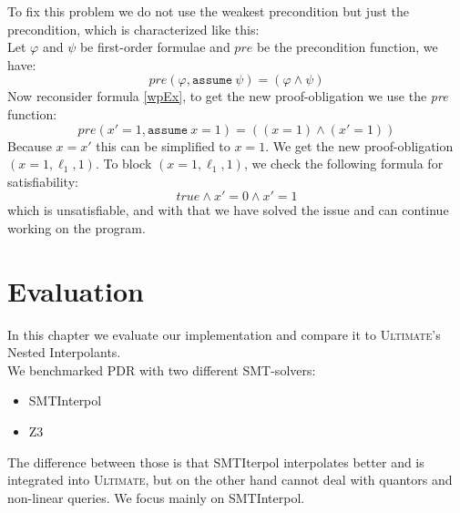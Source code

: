 \documentclass[11pt, a4paper, BCOR=10mm, ngerman]{scrbook}
\begin{document}
To fix this problem we do not use the weakest precondition but just the precondition, which is characterized like this: \\
Let $\varphi$ and $\psi$ be first-order formulae and $pre$ be the precondition function, we have: 
\begin{equation*}
pre(\varphi, \texttt{assume}\ \psi) = (\varphi \land \psi)
\end{equation*}
Now reconsider formula \eqref{wpEx}, to get the new proof-obligation we use the \textsl{pre} function: 
\begin{equation*}
		pre(x' = 1, \texttt{assume}\ x = 1) = ((x = 1) \land (x' = 1))
\end{equation*}
Because $x = x'$ this can be simplified to $x = 1$. We get the new proof-obligation $(x = 1, \ell_1, 1)$.
To block $(x = 1, \ell_1, 1)$, we check the following formula for satisfiability: 
\begin{equation*}
true\land x' = 0 \land x' = 1
\end{equation*}
which is unsatisfiable, and with that we have solved the issue and can continue working on the program. \par


\chapter{Evaluation}
In this chapter we evaluate our implementation and compare it to \textsc{Ultimate}'s Nested Interpolants. \\
We benchmarked PDR with two different SMT-solvers: 
\begin{itemize}
\item SMTInterpol \cite{Zitat03}
\item Z3 \cite{Zitat04}
\end{itemize}
The difference between those is that SMTIterpol interpolates better and is integrated into \textsc{Ultimate}, but on the other hand cannot deal with quantors and non-linear queries. We focus mainly on SMTInterpol.
\end{document}
